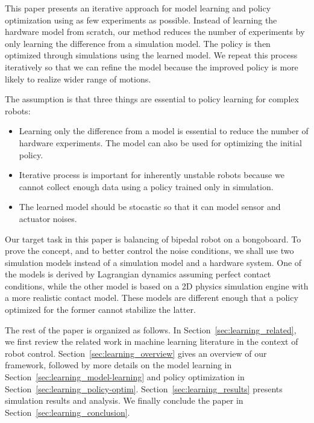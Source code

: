 This paper presents an iterative approach for model learning and
policy optimization using as few experiments as possible.
Instead of learning the hardware model from scratch, our method reduces
the number of experiments by only learning the difference from a
simulation model.
The policy is then optimized through simulations using the learned
model.
We repeat this process iteratively so that we can refine the model
because the improved policy is more likely to realize wider range of
motions.

The assumption is that three things are essential to policy learning for
complex robots:
\begin{itemize}
\item Learning only the difference from a model is essential to reduce
the number of hardware experiments.  The model can also be used 
	  for optimizing the initial policy.
\item Iterative process is important for inherently unstable robots because
	  we cannot collect enough data using a policy trained only in simulation.
\item The learned model should be stocastic so that it can model
	  sensor and actuator noises.
\end{itemize}

Our target task in this paper is balancing of bipedal robot on a
bongoboard.
To prove the concept, and to better control the noise conditions, we shall use
two simulation models instead of a simulation model and a hardware system.
One of the models is derived by Lagrangian dynamics assuming perfect
contact conditions, while the other model is based on a 2D physics
simulation engine with a more realistic contact model.
These models are different enough that a policy optimized
for the former cannot stabilize the latter.

The rest of the paper is organized as follows.
In Section~\ref{sec:learning_related}, we first review the related work in
machine learning literature in the context of robot control.
Section~\ref{sec:learning_overview} gives an overview of our framework, followed
by more details on the model learning in
Section~\ref{sec:learning_model-learning} and policy optimization in
Section~\ref{sec:learning_policy-optim}.
Section~\ref{sec:learning_results} presents simulation results and analysis.
We finally conclude the paper in Section~\ref{sec:learning_conclusion}.


